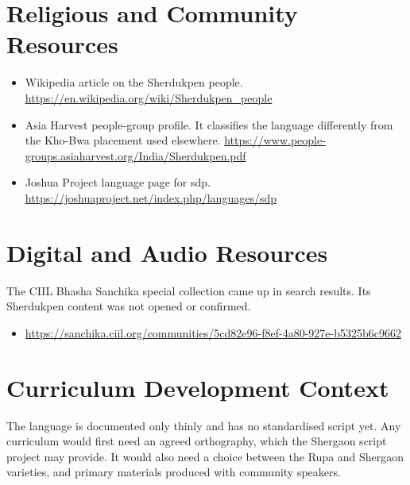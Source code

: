 \documentclass[12pt]{article}
\begin{document}
\section{Religious and Community Resources}
\begin{itemize}
\item Wikipedia article on the Sherdukpen people. \url{https://en.wikipedia.org/wiki/Sherdukpen_people}
\item Asia Harvest people-group profile. It classifies the language differently from the Kho-Bwa placement used elsewhere. \url{https://www.people-groups.asiaharvest.org/India/Sherdukpen.pdf}
\item Joshua Project language page for sdp. \url{https://joshuaproject.net/index.php/languages/sdp}
\end{itemize}

\section{Digital and Audio Resources}
The CIIL Bhasha Sanchika special collection came up in search results. Its Sherdukpen content was not opened or confirmed.
\begin{itemize}
\item \url{https://sanchika.ciil.org/communities/5cd82e96-f8ef-4a80-927e-b5325b6c9662}
\end{itemize}

\section{Curriculum Development Context}
The language is documented only thinly and has no standardised script yet. Any curriculum would first need an agreed orthography, which the Shergaon script project may provide. It would also need a choice between the Rupa and Shergaon varieties, and primary materials produced with community speakers.
\end{document}
